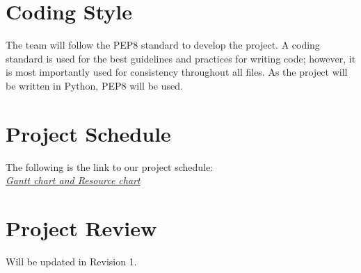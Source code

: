 \documentclass{article}
\begin{document}
\section{Coding Style}
The team will follow the PEP8 standard to develop the project. A coding standard is used for the best guidelines and practices for writing code; however, it is most importantly used for consistency throughout all files. As the project will be written in Python, PEP8 will be used.   

\section{Project Schedule}
The following is the link to our project schedule:\\
\href{https://gitlab.cas.mcmaster.ca/se_3xa3_l3g15/se_3xa3_project/-/tree/master/ProjectSchedule/GanttT-Rex.gan}{\textit{Gantt chart and Resource chart}}

\section{Project Review}
Will be updated in Revision 1.
\end{document}
